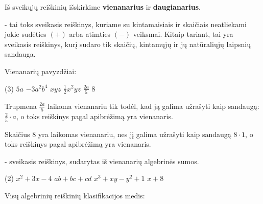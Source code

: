 \documentclass[11pt,a4paper]{scrartcl}
\begin{document}
Iš sveikųjų reiškinių išskirkime \textbf{vienanarius} ir \textbf{daugianarius}.
\begin{definition}
     - tai toks sveikasis reiškinys, kuriame su kintamaisiais ir skaičiais neatliekami jokie sudėties $(+)$  arba atimties $(-)$ veiksmai. Kitaip tariant, tai yra sveikasis reiškinys, kurį sudaro tik skaičių, kintamųjų ir jų natūraliųjų laipsnių sandauga.
\end{definition}
\begin{example}
Vienanarių pavyzdžiai:
\begin{tasks}[style = itemize](3)
    \task $5a$
    \task $-3a ^{2} b ^{4} $
    \task $xyz$
    \task $\frac{1}{2}x ^{2} yz $ 
    \task $\frac{2a}{5} $
    \task $8$ 
\end{tasks}

\end{example}
\begin{remark}
 Trupmena $\frac{2 a}{5}$ laikoma vienanariu tik todėl, kad ją galima užrašyti kaip sandaugą: $\frac{2}{5} \cdot a$, o toks reiškinys pagal apibrėžimą yra vienanaris. 
\end{remark}

\begin{remark}
Skaičius $8$ yra laikomas vienanariu, nes jį galima užrašyti kaip sandaugą $8 \cdot 1$, o toks reiškinys pagal apibrėžimą yra vienanaris.
\end{remark}

\begin{definition}
     - sveikasis reiškinys, sudarytas iš vienanarių algebrinės sumos.
\end{definition}

\begin{example}
    \begin{tasks}[style = itemize](2)
        \task $x ^{2} +3x-4$
        \task $ab+bc+cd$
        \task $x ^{3} +xy-y ^{2}+1 $
        \task $x+8$ 
    \end{tasks}
\end{example}


Visų algebrinių reiškinių klasifikacijos medis:
\end{document}

